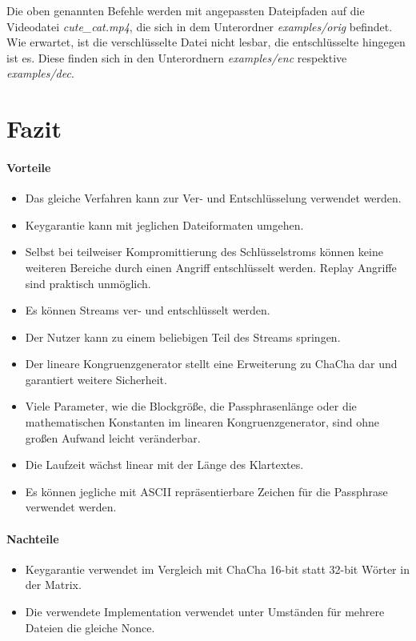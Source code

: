 \documentclass[10pt,a4paper]{article}
\begin{document}
Die oben genannten Befehle werden mit angepassten Dateipfaden auf die Videodatei \textit{cute\_cat.mp4}, die sich in dem Unterordner \textit{examples/orig} befindet.
Wie erwartet, ist die verschlüsselte Datei nicht lesbar, die entschlüsselte hingegen ist es.
Diese finden sich in den Unterordnern \textit{examples/enc} respektive \textit{examples/dec}.

\section{Fazit}

\paragraph{Vorteile}
\begin{itemize}
    \item Das gleiche Verfahren kann zur Ver- und Entschlüsselung verwendet werden.
    \item Keygarantie kann mit jeglichen Dateiformaten umgehen.
    \item Selbst bei teilweiser Kompromittierung des Schlüsselstroms können keine weiteren Bereiche durch einen Angriff entschlüsselt werden.
          Replay Angriffe sind praktisch unmöglich.
    \item Es können Streams ver- und entschlüsselt werden.
    \item Der Nutzer kann zu einem beliebigen Teil des Streams springen.
    \item Der lineare Kongruenzgenerator stellt eine Erweiterung zu ChaCha dar und garantiert weitere Sicherheit.
    \item Viele Parameter, wie die Blockgröße, die Passphrasenlänge oder die mathematischen Konstanten im linearen Kongruenzgenerator, sind ohne großen Aufwand leicht veränderbar.
    \item Die Laufzeit wächst linear mit der Länge des Klartextes.
    \item Es können jegliche mit ASCII repräsentierbare Zeichen für die Passphrase verwendet werden.
\end{itemize}

\paragraph{Nachteile}
\begin{itemize}
    \item Keygarantie verwendet im Vergleich mit ChaCha 16-bit statt 32-bit Wörter in der Matrix.
    \item Die verwendete Implementation verwendet unter Umständen für mehrere Dateien die gleiche Nonce.
\end{itemize}
\end{document}
